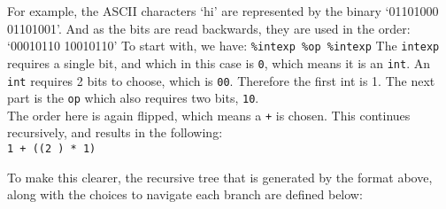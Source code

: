 For example, the ASCII characters `hi' are represented by the binary `01101000 01101001'.
And as the bits are read backwards, they are used in the order: `00010110 10010110'
To start with, we have:
\texttt{\%intexp \%op \%intexp}
The \texttt{intexp} requires a single bit, and which in this case is \texttt{0}, which means it is an \texttt{int}. An \texttt{int} requires 2 bits to choose, which is \texttt{00}.
Therefore the first int is 1. The next part is the \texttt{op} which also requires two bits, \texttt{10}.\\
The order here is again flipped, which means a \texttt{+} is chosen.
This continues recursively, and results in the following: \\
\texttt{1 + ((2 ) * 1)}\par
To make this clearer, the recursive tree that is generated by the format above, along with the choices to navigate each branch are defined below:

